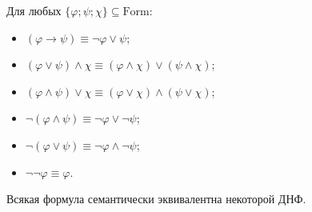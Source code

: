 \documentclass[12pt,a4paper]{article}
\newcommand{\Formul}{\ensuremath{\mathrm{Form}}\xspace}
\begin{document}
    \begin{example}
        Для любых $\{\varphi; \psi; \chi\} \subseteq \Formul$:
        \begin{itemize}
            \item $(\varphi \rightarrow \psi) \equiv \neg \varphi \vee \psi$;
            \item $(\varphi \vee \psi) \wedge \chi \equiv (\varphi \wedge \chi) \vee (\psi \wedge \chi)$;
            \item $(\varphi \wedge \psi) \vee \chi \equiv (\varphi \vee \chi) \wedge (\psi \vee \chi)$;
            \item $\neg (\varphi \wedge \psi) \equiv \neg \varphi \vee \neg \psi$;
            \item $\neg (\varphi \vee \psi) \equiv \neg \varphi \wedge \neg \psi$;
            \item $\neg \neg \varphi \equiv \varphi$.
        \end{itemize}
    \end{example}

    \begin{exercise}
        Всякая формула семантически эквивалентна некоторой ДНФ.
    \end{exercise}
\end{document}
